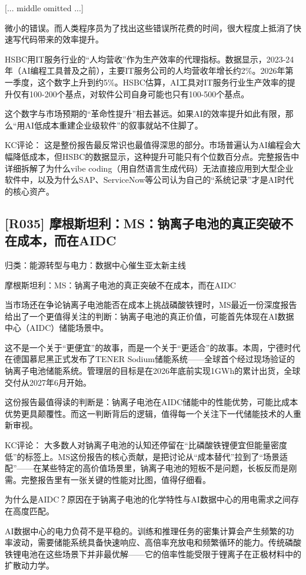 \documentclass[11pt]{ctexart}
\begin{document}
[... middle omitted ...]

微小的错误。而人类程序员为了找出这些错误所花费的时间，很大程度上抵消了快速写代码带来的效率提升。

HSBC用IT服务行业的“人均营收”作为生产效率的代理指标。数据显示，2023-24年（AI编程工具普及之前），主要IT服务公司的人均营收年增长约2\%。2026年第一季度，这个数字上升到约5\%。HSBC估算，AI工具对IT服务行业生产效率的提升仅有100-200个基点，对软件公司自身可能也只有100-500个基点。

这个数字与市场预期的“革命性提升”相去甚远。如果AI的效率提升如此有限，那么“用AI低成本重建企业级软件”的叙事就站不住脚了。

KC评论： 这是整份报告最反常识也最值得深思的部分。市场普遍认为AI编程会大幅降低成本，但HSBC的数据显示，这种提升可能只有个位数百分点。完整报告中详细拆解了为什么vibe coding（用自然语言生成代码）无法直接应用到大型企业软件中，以及为什么SAP、ServiceNow等公司认为自己的“系统记录”才是AI时代的核心资产。

\subsection{[R035] 摩根斯坦利：MS：钠离子电池的真正突破不在成本，而在AIDC}
{\small\color{refgray}归类：能源转型与电力：数据中心催生亚太新主线}

摩根斯坦利：MS：钠离子电池的真正突破不在成本，而在AIDC

当市场还在争论钠离子电池能否在成本上挑战磷酸铁锂时，MS最近一份深度报告给出了一个更值得关注的判断：钠离子电池的真正价值，可能首先体现在AI数据中心（AIDC）储能场景中。

这不是一个关于“更便宜”的故事，而是一个关于“更适合”的故事。本周，宁德时代在德国慕尼黑正式发布了TENER Sodium储能系统——全球首个经过现场验证的钠离子电池储能系统。管理层的目标是在2026年底前实现1GWh的累计出货，全球交付从2027年6月开始。

这份报告最值得读的判断是：钠离子电池在AIDC储能中的性能优势，可能比成本优势更具颠覆性。而这一判断背后的逻辑，值得每一个关注下一代储能技术的人重新审视。

KC评论： 大多数人对钠离子电池的认知还停留在“比磷酸铁锂便宜但能量密度低”的标签上。MS这份报告的核心贡献，是把讨论从“成本替代”拉到了“场景适配”——在某些特定的高价值场景里，钠离子电池的短板不是问题，长板反而是刚需。完整报告里有一张关键的性能对比图，值得仔细看。

为什么是AIDC？原因在于钠离子电池的化学特性与AI数据中心的用电需求之间存在高度匹配。

AI数据中心的电力负荷不是平稳的。训练和推理任务的密集计算会产生频繁的功率波动，需要储能系统具备快速响应、高倍率充放电和频繁循环的能力。传统磷酸铁锂电池在这些场景下并非最优解——它的倍率性能受限于锂离子在正极材料中的扩散动力学。
\end{document}
